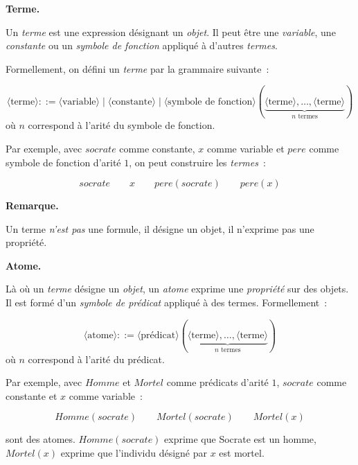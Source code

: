 \documentclass[11pt]{article}
\newenvironment{paraph}[1]{%
  \medskip
  \noindent\textbf{#1.}\quad

  \vspace{0.2cm}
}{%
  \medskip
}
\newenvironment{remarque}{%
    \begin{mdframed}[
        linecolor=sectioncolor!40,
        linewidth=0.8pt,
        backgroundcolor=sectioncolor!5,
        innerleftmargin=10pt,
        innerrightmargin=10pt,
        innertopmargin=6pt,
        innerbottommargin=6pt,
        skipabove=8pt,
        skipbelow=8pt
    ]
    \noindent\textbf{\small\color{sectioncolor}Remarque.}\enspace\small\itshape
}{%
    \end{mdframed}
}
\begin{document}
\begin{paraph}{Terme}
Un \textit{terme} est une expression désignant un \textit{objet}. 
Il peut être une \textit{variable}, une \textit{constante} ou un 
\textit{symbole de fonction} appliqué à d'autres \textit{termes}. 

Formellement, on défini un \textit{terme} par la grammaire suivante~:

\[
\langle\text{terme}\rangle ::= \langle\text{variable}\rangle \mid
\langle\text{constante}\rangle \mid
\langle\text{symbole de fonction}\rangle(\underbrace{\langle\text{terme}\rangle, \ldots,
\langle\text{terme}\rangle}_{n \text{ termes}})
\]
\noindent où $n$ correspond à l'arité du symbole de fonction.

\vspace{0.2cm}
Par exemple, avec $\mathit{socrate}$ comme constante, $x$ comme variable et 
$\mathit{pere}$ comme symbole de fonction d'arité $1$, on 
peut construire les \textit{termes}~:

\[
\mathit{socrate} \qquad x \qquad \mathit{pere}(\mathit{socrate}) \qquad 
\mathit{pere}(x)
\]
\end{paraph}

\begin{remarque}
    Un terme \emph{n'est pas} une formule, il désigne un objet, 
    il n'exprime pas une propriété.
\end{remarque}

\begin{paraph}{Atome}
Là où un \textit{terme} désigne un \textit{objet}, un \textit{atome} exprime 
une \textit{propriété} sur des objets. Il est formé 
d'un \textit{symbole de prédicat} appliqué à des termes. Formellement~:

\vspace{0.2cm}
\[
\langle\text{atome}\rangle ::= \langle\text{prédicat}\rangle
(\underbrace{\langle\text{terme}\rangle, \ldots,
\langle\text{terme}\rangle}_{n \text{ termes}})
\]
\noindent où $n$ correspond à l'arité du prédicat.

\vspace{0.2cm}
Par exemple, avec $\mathit{Homme}$ et $\mathit{Mortel}$ 
comme prédicats d'arité $1$, $\mathit{socrate}$ comme 
constante et $x$ comme variable~:

\[
\mathit{Homme}(\mathit{socrate}) \qquad \mathit{Mortel}(\mathit{socrate}) 
\qquad \mathit{Mortel}(x)
\]

sont des atomes. $\mathit{Homme}(\mathit{socrate})$ 
exprime que Socrate est un homme, $\mathit{Mortel}(x)$ 
exprime que l'individu désigné par $x$ est mortel.
\end{paraph}
\end{document}
